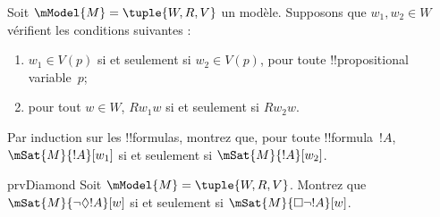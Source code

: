\documentclass[../../../include/open-logic-section]{subfiles}
\begin{document}
\begin{prob}
  Soit $\mModel{M} = \tuple{W, R, V}$ un modèle. Supposons que
  $w_1, w_2 \in W$ vérifient les conditions suivantes :
  \begin{enumerate}
  \item $w_1 \in V(p)$ si et seulement si $w_2 \in V(p)$, pour
    toute !!{propositional variable}~$p$;
  \item pour tout $w \in W$, $Rw_1w$ si et seulement si $Rw_2w$.
  \end{enumerate}
  Par induction sur les !!{formula}s, montrez que, pour toute
  !!{formula}~$!A$, $\mSat{M}{!A}[w_1]$ si et seulement si
  $\mSat{M}{!A}[w_2]$.
\end{prob}

\begin{probtag}{prvDiamond}
  Soit $\mModel{M} = \tuple{W, R, V}$. Montrez que
  $\mSat{M}{\lnot\Diamond !A}[w]$ si et seulement si
  $\mSat{M}{\Box\lnot!A}[w]$.
\end{probtag}
\end{document}
